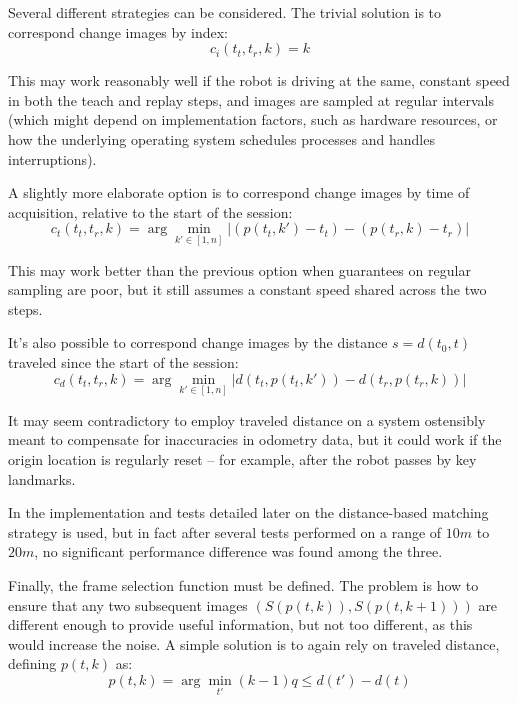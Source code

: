 \documentclass[twocolumn, 9pt,fleqn]{jsproceedings}
\begin{document}
Several different strategies can be considered. The trivial solution is to correspond change images by index:
\begin{equation}
c_i(t_t, t_r, k) = k
\end{equation}

This may work reasonably well if the robot is driving at the same, constant speed in both the teach and replay steps, and images are sampled at regular intervals (which might depend on implementation factors, such as hardware resources, or how the underlying operating system schedules processes and handles interruptions).

A slightly more elaborate option is to correspond change images by time of acquisition, relative to the start of the session:
\begin{equation}
c_t(t_t, t_r, k) = \arg \min_{k' \in [1, n]} {| (p(t_t, k') - t_t) - (p(t_r, k) - t_r) |}
\end{equation}

This may work better than the previous option when guarantees on regular sampling are poor, but it still assumes a constant speed shared across the two steps.

It's also possible to correspond change images by the distance $s = d(t_0, t)$ traveled since the start of the session:
\begin{equation}
c_d(t_t, t_r, k) = \arg \min_{k' \in [1, n]} {| d(t_t, p(t_t, k')) - d(t_r, p(t_r, k)) |}
\end{equation}

It may seem contradictory to employ traveled distance on a system ostensibly meant to compensate for inaccuracies in odometry data, but it could work if the origin location is regularly reset -- for example, after the robot passes by key landmarks.

In the implementation and tests detailed later on the distance-based matching strategy is used, but in fact after several tests performed on a range of $10m$ to $20m$, no significant performance difference was found among the three.

Finally, the frame selection function must be defined. The problem is how to ensure that any two subsequent images $(S(p(t, k)), S(p(t, k+1)))$ are different enough to provide useful information, but not too different, as this would increase the noise. A simple solution is to again rely on traveled distance, defining  $p(t, k)$ as:
\begin{equation}
p(t, k) = \arg \min_{t'} {(k - 1)q \leq d(t') - d(t)}
\end{equation}
\end{document}
